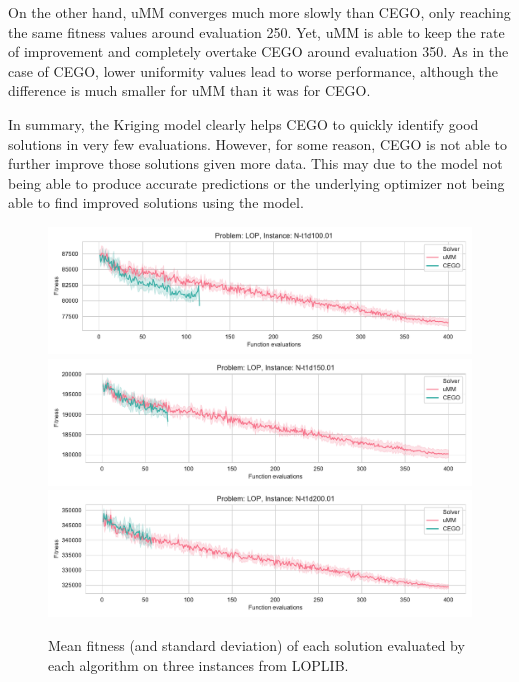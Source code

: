 \documentclass[runningheads]{llncs}
\begin{document}
On the other hand, uMM converges much more slowly than CEGO, only reaching the
same fitness values around evaluation 250. Yet, uMM is able to keep the rate of
improvement and completely overtake CEGO around evaluation 350. As in the case
of CEGO, lower uniformity values lead to worse performance, although the
difference is much smaller for uMM than it was for CEGO.

In summary, the Kriging model clearly helps CEGO to quickly identify good
solutions in very few evaluations. However, for some reason, CEGO is not able to
further improve those solutions given more data. This may due to the
model not being able to produce accurate predictions or the underlying
optimizer not being able to find improved solutions using the model.

\newcommand{\supplement}{\citep{Supplementary}}


\begin{figure}
  \centering%
  \includegraphics[width=\textwidth]{img/fitness_real_lop_RandA1_N-t1d100_01}\\
  \includegraphics[width=\textwidth]{img/fitness_real_lop_RandA1_N-t1d150_01}\\
  \includegraphics[width=\textwidth]{img/fitness_real_lop_RandA1_N-t1d200_01}\\
    \caption{Mean fitness  (and standard deviation)  of each solution evaluated by each algorithm on three instances from LOPLIB.\label{fig:loplib}}
  \end{figure}
\end{document}

